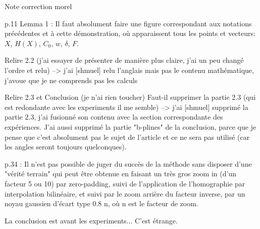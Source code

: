 Note correction morel

p.11 Lemma 1 :  Il faut absolument faire une figure correspondant aux notations précédentes et à cette démonstration, où apparaissent tous  les points et vecteurs: $X$, $H(X)$, $C_0$, $w$, $\delta$, $F$.

Relire 2.2 (j’ai essayer de présenter de manière plus claire, j’ai un peu changé l’ordre et relu)
--> j'ai [shmuel] relu l'anglais mais pas le contenu mathématique, j'avoue que je ne comprends pas les calculs

Relire 2.3 et Conclusion (je n’ai rien toucher) 
Faut-il supprimer la partie 2.3 (qui est redondante avec les experiments il me semble)
--> j'ai [shmuel] supprimé la partie 2.3, j'ai fusionné son contenu avec la section correspondante des expériences. J'ai aussi supprimé la partie "b-plines" de la conclusion, parce que je pense que c'est absolument pas le sujet de l'article et ce ne sera pas utilisé (car les angles seront toujours quelconques).

p.34 : Il n'est pas possible de juger du succès de la méthode sans disposer d'une "vérité terrain" qui peut être obtenue en faisant un très gros zoom in (d'un facteur 5 ou 10) par zero-padding, suivi de l'application de l'homographie par interpolation bilinéaire, et suivi par le zoom arrière du facteur inverse, par un noyau gaussien d'écart type 0.8 n, où n est  le facteur de zoom.





La conclusion est avant les experiments... C'est étrange.
